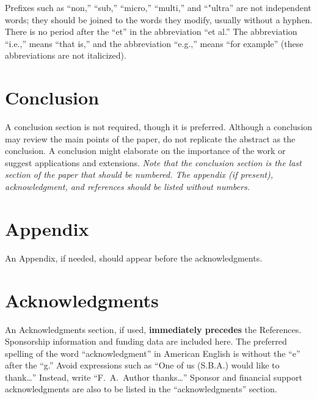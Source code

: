 \documentclass[conf]{new-aiaa}
\begin{document}
    Prefixes such as ``non,'' ``sub,'' ``micro,'' ``multi,'' and ``"ultra'' are not independent words; they should be joined to the words they modify, usually without a hyphen. There is no period after the ``et'' in the abbreviation ``et al.'' The abbreviation ``i.e.,'' means ``that is,'' and the abbreviation ``e.g.,'' means ``for example'' (these abbreviations are not italicized).

    \section{Conclusion}

    A conclusion section is not required, though it is preferred. Although a conclusion may review the main points of the paper, do not replicate the abstract as the conclusion. A conclusion might elaborate on the importance of the work or suggest applications and extensions. \textit{Note that the conclusion section is the last section of the paper that should be numbered. The appendix (if present), acknowledgment, and references should be listed without numbers.}

    \section*{Appendix}

    An Appendix, if needed, should appear before the acknowledgments.

    \section*{Acknowledgments}
    
    An Acknowledgments section, if used, \textbf{immediately precedes} the References. Sponsorship information and funding data are included here. The preferred spelling of the word ``acknowledgment'' in American English is without the ``e'' after the ``g.'' Avoid expressions such as ``One of us (S.B.A.) would like to thank\ldots'' Instead, write ``F.~A.~Author thanks\ldots'' Sponsor and financial support acknowledgments are also to be listed in the ``acknowledgments'' section.

    
\end{document}
